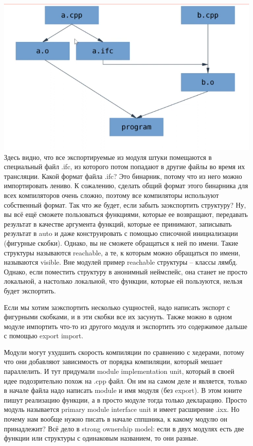 \documentclass[12pt, a4paper]{article}
\begin{document}
\\\\
\includegraphics[scale=0.65]{module_compile.png}\\
Здесь видно, что все экспортируемые из модуля штуки помещаются в специальный файл .ifc, из которого потом попадают в другие файлы во время их трансляции. Какой формат файла .ifc? Это бинарник, потому что из него можно импортировать лениво. К сожалению, сделать общий формат этого бинарника для всех компиляторов очень сложно, поэтому все компиляторы используют собственный формат. Так что же будет, если забыть заэкспортить структуру? Ну, вы всё ещё сможете пользоваться функциями, которые ее возвращают, передавать результат в качестве аргумента функций, которые ее принимают, записывать результат в auto и даже конструировать с помощью списочной инициализации (фигурные скобки). Однако, вы не сможете обращаться к ней по имени. Такие структуры называются reachable, а те, к которым можно обращаться по имени, называются visible. Вне модулей пример reachable структуры -- классы лямбд. Однако, если поместить структуру в анонимный неймспейс, она станет не просто локальной, а настолько локальной, что функции, которые ей пользуются, нельзя будет экспортить.
\par Если мы хотим заэкспортить несколько сущностей, надо написать экспорт с фигурными скобками, и в эти скобки все их засунуть. Также можно в одном модуле импортить что-то из другого модуля и экспортить это содержимое дальше с помощью export import.
\par Модули могут ухудшить скорость компиляции по сравнению с хедерами, потому что они добавляют зависимость от порядка компиляции, который мешает параллелить. И тут придумали module implementation unit, который в своей идее подозрительно похож на .cpp файл. Он им на самом деле и является, только в начале файла надо написать module и имя модуля (без export). В этом юните пишут реализацию функции, а в просто модуле тогда только декларацию. Просто модуль называется primary module interface unit и имеет расширение .ixx. Но почему нам вообще нужно писать в начале сппшника, к какому модулю он принадлежит? Всё дело в strong ownership model: если в двух модулях есть две функции или структуры с одинаковым названием, то они разные.
\end{document}
